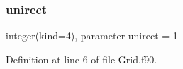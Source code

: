 \hypertarget{namespacegrid_ae5c8d9b8d49f1a584ddc38e794825323}{}\label{namespacegrid_ae5c8d9b8d49f1a584ddc38e794825323} 
\subsubsection{\texorpdfstring{unirect}{unirect}}
{\footnotesize\ttfamily integer(kind=4), parameter unirect = 1}



Definition at line 6 of file Grid.\+f90.

